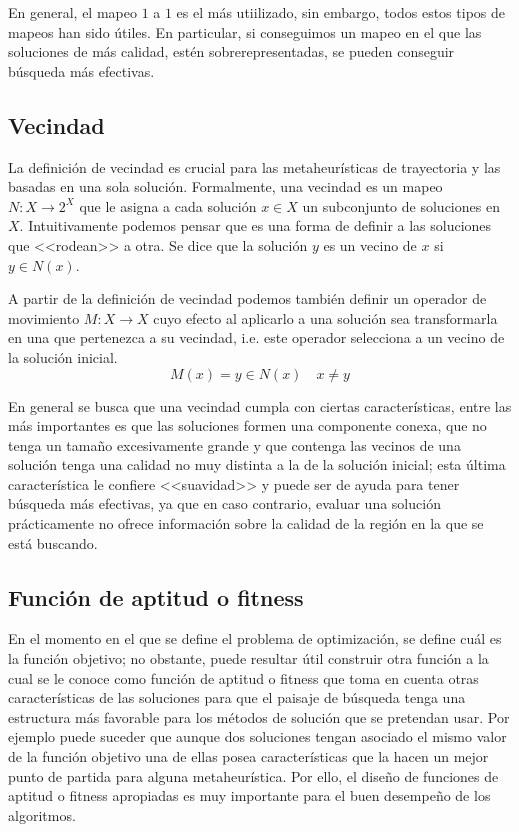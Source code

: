 En general, el mapeo $1$ a $1$ es el más utiilizado, sin embargo, todos estos tipos de mapeos han sido útiles.
%
En particular, si conseguimos un mapeo en el que las soluciones de más calidad, estén sobrerepresentadas, se pueden conseguir búsqueda más efectivas.

\subsection{Vecindad}
La definición de vecindad es crucial para las metaheurísticas de trayectoria y las basadas en una sola solución.
%
Formalmente, una vecindad es un mapeo $N:X\rightarrow 2^X$ que le asigna a cada solución $x\in X$ un subconjunto de soluciones en $X$. 
%
Intuitivamente podemos pensar que es una forma de definir a las soluciones que <<rodean>> a otra. 
%
Se dice que la solución $y$ es un vecino de $x$ si $y\in N(x)$.

A partir de la definición de vecindad podemos también definir un operador de movimiento $M:X\rightarrow X$ cuyo efecto al aplicarlo a una solución sea 
transformarla en una que pertenezca a su vecindad, i.e. este operador selecciona a un vecino de la solución inicial.  
\[M(x)=y\in N(x)\quad x\neq y\]

En general se busca que una vecindad cumpla con ciertas características, entre las más importantes es que las soluciones formen una componente conexa, 
que no tenga un tamaño excesivamente grande y que contenga las vecinos de una solución tenga una calidad no muy distinta a la de la solución inicial;
esta última característica le confiere <<suavidad>> y puede ser de ayuda para tener búsqueda más efectivas, ya que en caso contrario, evaluar una
solución prácticamente no ofrece información sobre la calidad de la región en la que se está buscando.

\subsection{Funci\'on de aptitud o fitness}
En el momento en el que se define el problema de optimización, se define cuál es la función objetivo; 
no obstante, puede resultar útil construir otra función a la cual se le conoce como función de aptitud o fitness que toma en cuenta otras características 
de las soluciones para que el paisaje de búsqueda tenga una estructura más favorable para los métodos de solución que se pretendan usar. 
%
Por ejemplo puede suceder que aunque dos soluciones tengan asociado el mismo valor de la función objetivo una de ellas posea características que la hacen 
un mejor punto de partida para alguna metaheurística.
%
Por ello, el diseño de funciones de aptitud o fitness apropiadas es muy importante para el buen desempeño de los algoritmos.

